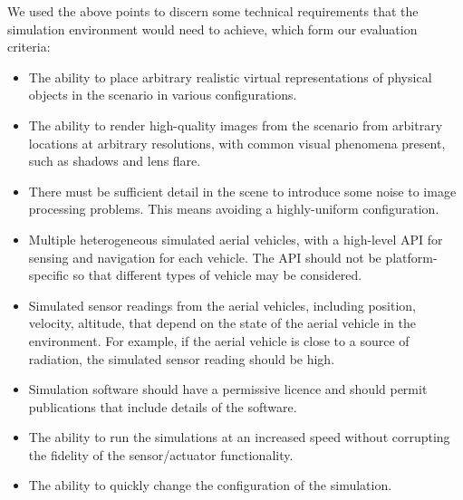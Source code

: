 We used the above points to discern some technical requirements that the simulation environment would need to achieve, which form our evaluation criteria:
\begin{itemize}
    \item The ability to place arbitrary realistic virtual representations of physical objects in the scenario in various configurations.
    \item The ability to render high-quality images from the scenario from arbitrary locations at arbitrary resolutions, with common visual phenomena present, such as shadows and lens flare.
    \item There must be sufficient detail in the scene to introduce some noise to image processing problems. This means avoiding a highly-uniform configuration.
    \item Multiple heterogeneous simulated aerial vehicles, with a high-level API for sensing and navigation for each vehicle. The API should not be platform-specific so that different types of vehicle may be considered.
    \item Simulated sensor readings from the aerial vehicles, including position, velocity, altitude, that depend on the state of the aerial vehicle in the environment. For example, if the aerial vehicle is close to a source of radiation, the simulated sensor reading should be high.
    \item Simulation software should have a permissive licence and should permit publications that include details of the software.
    \item The ability to run the simulations at an increased speed without corrupting the fidelity of the sensor/actuator functionality.
    \item The ability to quickly change the configuration of the simulation.
\end{itemize}

